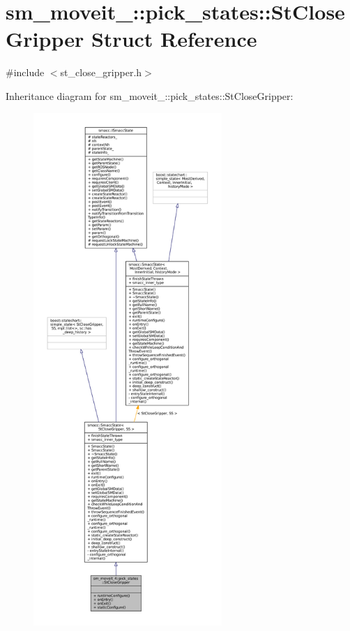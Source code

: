 \hypertarget{structsm__moveit__4_1_1pick__states_1_1StCloseGripper}{}\section{sm\+\_\+moveit\+\_\+:\+:pick\+\_\+states\+:\+:St\+Close\+Gripper Struct Reference}
\label{structsm__moveit__4_1_1pick__states_1_1StCloseGripper}


{\ttfamily \#include $<$st\+\_\+close\+\_\+gripper.\+h$>$}



Inheritance diagram for sm\+\_\+moveit\+\_\+:\+:pick\+\_\+states\+:\+:St\+Close\+Gripper\+:
\nopagebreak
\begin{figure}[H]
\begin{center}
\leavevmode
\includegraphics[height=550pt]{structsm__moveit__4_1_1pick__states_1_1StCloseGripper__inherit__graph}
\end{center}
\end{figure}


